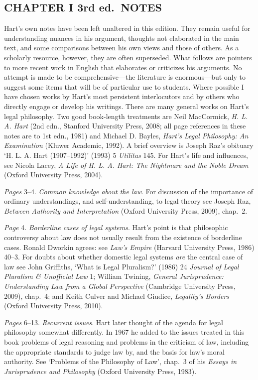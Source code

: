\documentclass[12pt,oneside]{book}  %
\begin{document}
\subsection{CHAPTER I 3rd ed.~NOTES}\label{chapter-i-3rd-ed.-notes}

Hart's own notes have been left unaltered in this edition. They remain
useful for understanding nuances in his argument, thoughts not
elaborated in the main text, and some comparisons between his own views
and those of others. As a scholarly resource, however, they are often
superseded. What follows are pointers to more recent work in English
that elaborates or criticizes his arguments. No attempt is made to be
comprehensive---the literature is enormous---but only to suggest some
items that will be of particular use to students. Where possible I have
chosen works by Hart's most persistent interlocutors and by others who
directly engage or develop his writings. There are many general works on
Hart's legal philosophy. Two good book-length treatments are Neil
MacCormick, \emph{H. L. A. Hart} (2nd edn., Stanford University Press,
2008; all page references in these notes are to 1st edn., 1981) and
Michael D. Bayles, \emph{Hart's Legal Philosophy: An Examination}
(Kluwer Academic, 1992). A brief overview is Joseph Raz's obituary `H.
L. A. Hart (1907--1992)' (1993) 5 \emph{Utilitas} 145. For Hart's life
and influences, see Nicola Lacey, \emph{A Life of H. L. A. Hart: The
Nightmare and the Noble Dream} (Oxford University Press, 2004).

\emph{Pages} 3--4. \emph{Common knowledge about the law}. For discussion
of the importance of ordinary understandings, and self-understanding, to
legal theory see Joseph Raz, \emph{Between Authority and Interpretation}
(Oxford University Press, 2009), chap.~2.

\emph{Page} 4. \emph{Borderline cases of legal systems}. Hart's point is
that philosophic controversy about law does not usually result from the
existence of borderline cases. Ronald Dworkin agrees: see \emph{Law's
Empire} (Harvard University Press, 1986) 40--3. For doubts about whether
domestic legal systems \emph{are} the central case of law see John
Griffiths, `What is Legal Pluralism?' (1986) 24 \emph{Journal of Legal
Pluralism \& Unofficial Law} 1; William Twining, \emph{General
Jurisprudence: Understanding Law from a Global Perspective} (Cambridge
University Press, 2009), chap.~4; and Keith Culver and Michael Giudice,
\emph{Legality's Borders} (Oxford University Press, 2010).

\emph{Pages} 6--13. \emph{Recurrent issues}. Hart later thought of the
agenda for legal philosophy somewhat differently. In 1967 he added to
the issues treated in this book problems of legal reasoning and problems
in the criticism of law, including the appropriate standards to judge
law by, and the basis for law's moral authority. See `Problems of the
Philosophy of Law', chap.~3 of his \emph{Essays in Jurisprudence and
Philosophy} (Oxford University Press, 1983).
\end{document}
